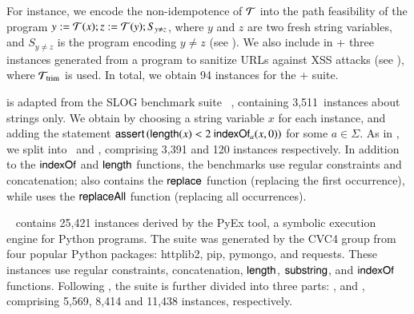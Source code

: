 %
For instance, we encode the non-idempotence of $\mathcal{T}$ into the path feasibility of the {\slint} program $y:=\mathcal{T}(x); z:=\mathcal{T}(y); S_{y \neq z}$, where $y$ and $z$ are two fresh string variables, and $S_{y \neq z}$ is the {\slint} program encoding $y \neq z$ (see 
\iftoggle{full}{Appendix~\ref{appendix:slint-prog-ineq} for the details}{the full version \cite{atva20-full} for the details}
). We also include in {\transducerbench+} three instances %
generated from a program to sanitize URLs against XSS attacks (see \iftoggle{full}{Appendix~\ref{exmp:running} for the details}{the full version \cite{atva20-full} for the details}), 
where $\mathcal{T}_{\rm trim}$ is used. 
In total, we obtain 94 instances for the {\transducerbench+} suite. 

\smallskip
\noindent{\slogbench} is adapted from the SLOG benchmark suite%
~\cite{fang-yu-circuits}, containing 3,511~instances about strings only.
We  obtain  {\slogbench}  by choosing a string variable $x$ for each instance,
and adding the statement $\textsf{assert}\left(\mathsf{length}(x) < 2\ \mathsf{indexOf}_{a}(x, 0)\right)$ for some $a \in \Sigma$.
As in \cite{CHL+19}, we  split  {\slogbench}  into  \slogbenchr\ and \slogbenchra,  comprising 3,391 and 120 instances respectively. In addition to %
the $\mathsf{indexOf}$ and $\mathsf{length}$ functions, the benchmarks use regular constraints and concatenation;  {\slogbenchr} also contains the $\mathsf{replace}$ function (replacing the first occurrence), while {\slogbenchra}  uses the $\mathsf{replaceAll}$ function (replacing all occurrences).

\smallskip
\noindent \pyexbench~\cite{ReynoldsWBBLT17} 
contains 25,421 instances  derived by the PyEx tool, a symbolic execution engine for Python programs. The {\pyexbench} suite was generated by the CVC4 group from four popular Python packages: httplib2, pip, pymongo, and requests. These instances use regular constraints, concatenation, $\mathsf{length}$, $\mathsf{substring}$, and $\mathsf{indexOf}$ functions. Following \cite{ReynoldsWBBLT17}, the {\pyexbench} suite is further divided into three parts: {\pyextdbench},  {\pyexztbench} and {\pyexzzbench}, comprising 5,569, 8,414 and 11,438  instances, respectively. 

